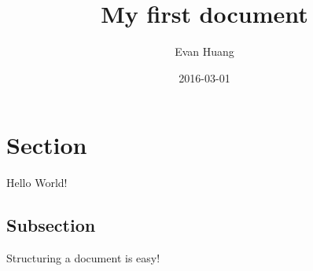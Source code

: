 \documentclass{article}
\title{My first document}
\date{2016-03-01}
\author{Evan Huang}
\begin{document}
	\maketitle
	\newpage

	\section{Section}

	
	Hello World!

		\subsection{Subsection}
		Structuring a document is easy!
\end{document}
